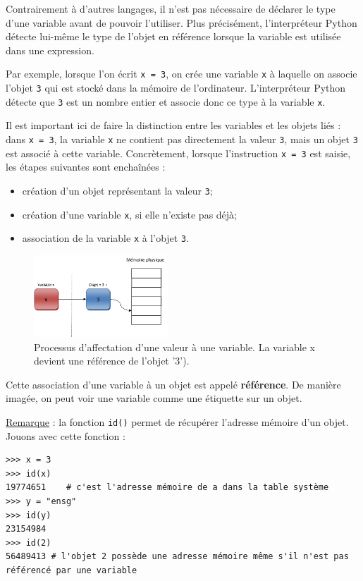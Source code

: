 \documentclass[12pt, a4paper]{article}
\begin{document}
Contrairement à d'autres langages, il n'est pas nécessaire de déclarer le type d'une variable avant de pouvoir l'utiliser. Plus précisément, l'interpréteur Python détecte lui-même le type de l'objet en référence lorsque la variable est utilisée dans une expression.

Par exemple, lorsque l'on écrit \lstinline{x = 3}, on crée une variable \lstinline{x} à laquelle on associe l'objet \lstinline{3} qui est stocké dans la mémoire de l'ordinateur. L'interpréteur Python détecte que \lstinline{3} est un nombre entier et associe donc ce type à la variable \lstinline{x}.

Il est important ici de faire la distinction entre les variables et les objets liés : dans \lstinline{x = 3}, la variable \lstinline{x} ne contient pas directement la valeur \lstinline{3}, mais un objet \lstinline{3} est associé à cette variable. Concrètement, lorsque l'instruction \lstinline{x = 3} est saisie, les étapes suivantes sont enchaînées :
\begin{itemize}
	\item création d'un objet représentant la valeur \lstinline{3};
	\item création d'une variable \lstinline{x}, si elle n'existe pas déjà;
	\item association de la variable \lstinline{x} à l'objet \lstinline{3}.
\end{itemize}

\begin{figure}[H]
	\center \includegraphics[width=0.45\textwidth]{img/affectation.png}
	\caption{Processus d'affectation d'une valeur à une variable. La variable x devient une référence de l'objet '3').}
	\label{fig:affectation}
\end{figure}

Cette association d'une variable à un objet est appelé \textbf{référence}. De manière imagée, on peut voir une variable comme une étiquette sur un objet. 

\underline{Remarque} : la fonction \lstinline{id()} permet de récupérer l'adresse mémoire d'un objet. Jouons avec cette fonction :
\begin{lstlisting}
>>> x = 3
>>> id(x)
19774651	# c'est l'adresse mémoire de a dans la table système
>>> y = "ensg"
>>> id(y)
23154984
>>> id(2)
56489413 # l'objet 2 possède une adresse mémoire même s'il n'est pas référencé par une variable
\end{lstlisting}
\end{document}
